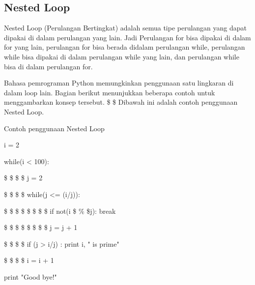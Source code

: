 \subsection{Nested Loop}
Nested Loop (Perulangan Bertingkat) adalah semua tipe perulangan yang dapat dipakai di dalam perulangan yang lain. Jadi Perulangan for bisa dipakai di dalam for yang lain, perulangan for bisa berada didalam perulangan while, perulangan while bisa dipakai di dalam perulangan while yang lain, dan perulangan while bisa di dalam perulangan for. \par
\vspace{12pt}
\noindent 
Bahasa pemrograman Python memungkinkan penggunaan satu lingkaran di dalam loop lain. Bagian berikut menunjukkan beberapa contoh untuk menggambarkan konsep tersebut. \$  \$\vspace{\baselineskip}
\vspace{\baselineskip}
Dibawah ini adalah contoh penggunaan Nested Loop. \par
\noindent 
Contoh penggunaan Nested Loop \par
\noindent 
\vspace{\baselineskip}
\vspace{\baselineskip}
i = 2 \par
\noindent 
\vspace{\baselineskip}
while(i < 100): \par
\noindent 
\vspace{\baselineskip}
 \$  \$  \$  \$ j = 2 \par
\noindent 
\vspace{\baselineskip}
 \$  \$  \$  \$ while(j <= (i/j)): \par
\noindent 
\vspace{\baselineskip}
 \$  \$  \$  \$  \$  \$  \$  \$ if not(i \$  \%  \$j): break \par
\noindent 
\vspace{\baselineskip}
 \$  \$  \$  \$  \$  \$  \$  \$ j = j + 1 \par
\noindent 
\vspace{\baselineskip}
 \$  \$  \$  \$ if (j > i/j) : print i, " is prime" \par
\noindent 
\vspace{\baselineskip}
 \$  \$  \$  \$ i = i + 1 \par
\noindent 
\vspace{\baselineskip}
\vspace{\baselineskip}
print "Good bye!" \par
\vspace{12pt}
